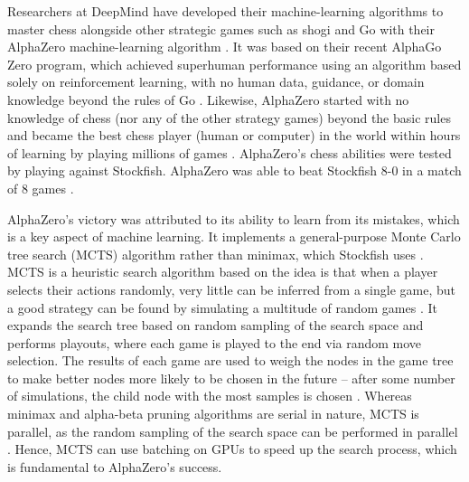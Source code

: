 \documentclass[%
 superscriptaddress,
showpacs,preprintnumbers,
 amsmath,
 amssymb,
 aps,
 pra,
showkeys,
onecolumn,
notitlepage,
11pt,
tightenlines      %
]{revtex4-1}
\begin{document}
Researchers at DeepMind have developed their machine-learning algorithms to master chess alongside other strategic games such as shogi and Go with their AlphaZero machine-learning algorithm \cite{silver2018general}. It was based on their recent AlphaGo Zero program, which achieved superhuman performance using an algorithm based solely on reinforcement learning, with no human data, guidance, or domain knowledge beyond the rules of Go \cite{silver2017mastering}. Likewise, AlphaZero started with no knowledge of chess (nor any of the other strategy games) beyond the basic rules and became the best chess player (human or computer) in the world within hours of learning by playing millions of games \cite{strogatz2018one}. AlphaZero's chess abilities were tested by playing against Stockfish. AlphaZero was able to beat Stockfish 8-0 in a match of 8 games \cite{silver2018general}.

AlphaZero's victory was attributed to its ability to learn from its mistakes, which is a key aspect of machine learning. It implements a general-purpose Monte Carlo tree search (MCTS) algorithm rather than minimax, which Stockfish uses \cite{silver2017mastering2}. MCTS is a heuristic search algorithm based on the idea is that when a player selects their actions randomly, very little can be inferred from a single game, but a good strategy can be found by simulating a multitude of random games \cite{chaslot2008monte}. It expands the search tree based on random sampling of the search space and performs playouts, where each game is played to the end via random move selection. The results of each game are used to weigh the nodes in the game tree to make better nodes more likely to be chosen in the future -- after some number of simulations, the child node with the most samples is chosen \cite{chaslot2008monte}. Whereas minimax and alpha-beta pruning algorithms are serial in nature, MCTS is parallel, as the random sampling of the search space can be performed in parallel \cite{silver2017mastering2}. Hence, MCTS can use batching on GPUs to speed up the search process, which is fundamental to AlphaZero's success.
\end{document}
